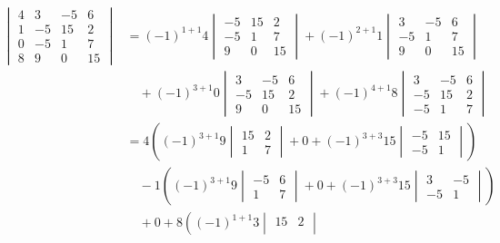 \documentclass[11pt]{homework}
\begin{document}
\begin{align*}
  \begin{vmatrix}
  4 & 3  & -5 & 6 \\
  1 & -5 & 15 & 2 \\
  0 & -5 & 1  & 7 \\
  8 & 9  & 0  & 15 
  \end{vmatrix}
  &= 
  (-1)^{1+1}
  4
  \begin{vmatrix}
  -5 & 15 & 2 \\
  -5 & 1  & 7 \\
  9  & 0  & 15 
  \end{vmatrix}
  +
  (-1)^{2+1}
  1
  \begin{vmatrix}
  3  & -5 & 6 \\
  -5 & 1  & 7 \\
  9  & 0  & 15 
  \end{vmatrix}\\
  & \quad +
  (-1)^{3+1}
  0
  \begin{vmatrix}
  3  & -5 & 6 \\
  -5 & 15 & 2 \\
  9  & 0  & 15 
  \end{vmatrix}
  +
  (-1)^{4+1}
  8
  \begin{vmatrix}
  3  & -5 & 6 \\
  -5 & 15 & 2 \\
  -5 & 1  & 7 
  \end{vmatrix} \\
  &= 
  4 \left(
  (-1)^{3+1}
  9
  \begin{vmatrix}
  15 & 2 \\
  1  & 7 
  \end{vmatrix}
  + 0
  + (-1)^{3+3}
  15
  \begin{vmatrix}
  -5 & 15 \\
  -5 & 1   
  \end{vmatrix}
  \right) \\
  & \quad - 1 \left(
  (-1)^{3+1}
  9
  \begin{vmatrix}
   -5 & 6 \\
   1  & 7 
  \end{vmatrix}
  + 0
  + (-1)^{3+3}
  15
  \begin{vmatrix}
  3  & -5 \\
  -5 & 1  
  \end{vmatrix}
  \right) \\
  & \quad + 0
  + 8 \left(
  (-1)^{1+1}
  3
  \begin{vmatrix}
   15 & 2 \\

\end{vmatrix}
\end{align*}
\end{document}
